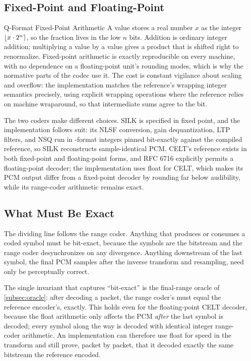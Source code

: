 \subsection{Fixed-Point and Floating-Point}\label{subsec:fixed_float}

\begin{concept}{Q-Format Fixed-Point Arithmetic}
  A  value stores a real number $x$ as the integer
  $\lfloor x \cdot 2^n\rceil$, so the fraction lives in the low $n$ bits. Addition is
  ordinary integer addition; multiplying a  value by a  value gives a
   product that is shifted right to renormalize. Fixed-point arithmetic
  is exactly reproducible on every machine, with no dependence on a
  floating-point
  unit's rounding modes, which is why the normative parts of the
  codec use it. The
  cost is constant vigilance about scaling and overflow: the implementation
  matches the reference's wrapping integer semantics precisely, using explicit
  wrapping operations where the reference relies on machine wraparound, so that
  intermediate sums agree to the bit.
\end{concept}

The two coders make different choices. SILK is specified in fixed point, and the
implementation follows suit: its NLSF conversion, gain dequantization, LTP
filters, and NSQ run in \Q{}-format integers pinned bit-exactly against the
compiled reference, so SILK reconstructs sample-identical PCM. CELT's reference
exists in both fixed-point and floating-point forms, and RFC 6716 explicitly
permits a floating-point decoder; the implementation uses float for CELT, which
makes its PCM output differ from a fixed-point decoder by rounding far below
audibility, while its range-coder arithmetic remains exact.

\subsection{What Must Be Exact}\label{subsec:what_exact}

The dividing line follows the range coder. Anything that produces or consumes a
coded symbol must be bit-exact, because the symbols are the bitstream and the
range coder desynchronizes on any divergence. Anything downstream of the last
symbol, the final PCM samples after the inverse transform and resampling, need
only be perceptually correct.

\begin{importantnote}
  The single invariant that captures ``bit-exact'' is the final-range oracle of
  \cref{subsec:oracle}: after decoding a packet, the range coder's 
  must equal the reference encoder's, exactly. This holds even for the
  floating-point CELT decoder, because the float arithmetic only affects the PCM
  \emph{after} the last symbol is decoded; every symbol along the way is decoded
  with identical integer range-coder arithmetic. An implementation can therefore
  use float for speed in the transform and still prove, packet by
  packet, that it
  decoded exactly the same bitstream the reference encoded.
\end{importantnote}

